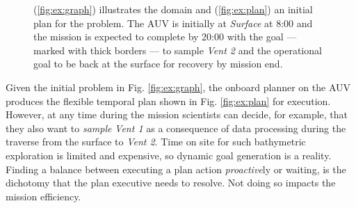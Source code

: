 \begin{figure}[!t]
  \centering
  \vskip-3mm
  \hfill {}
  \vskip-2mm
  \caption{\small{(\ref{fig:ex:graph}) illustrates the domain and
      (\ref{fig:ex:plan}) an initial plan for the problem. The AUV is
      initially at {\em Surface} at 8:00 and the mission is expected
      to complete by 20:00 with the goal --- marked with thick borders
      --- to sample {\em Vent 2} and the operational goal to be back
      at the surface for recovery by mission end.}}
  \label{fig:Example}
  \vskip-3mm
\end{figure}

Given the initial problem in Fig. \ref{fig:ex:graph}, the onboard
planner on the AUV produces the flexible temporal plan shown in
Fig. \ref{fig:ex:plan} for execution. However, at any time during the
mission scientists can decide, for example, that they also want to
{\em sample} {\em Vent 1} as a consequence of data processing during
the traverse from the surface to {\em Vent 2}.  Time on site for such
bathymetric exploration is limited and expensive, so dynamic goal
generation is a reality.  Finding a balance between executing a plan
action \emph{proactive}ly or waiting, is the dichotomy that the plan
executive needs to resolve. Not doing so impacts the mission
efficiency.

